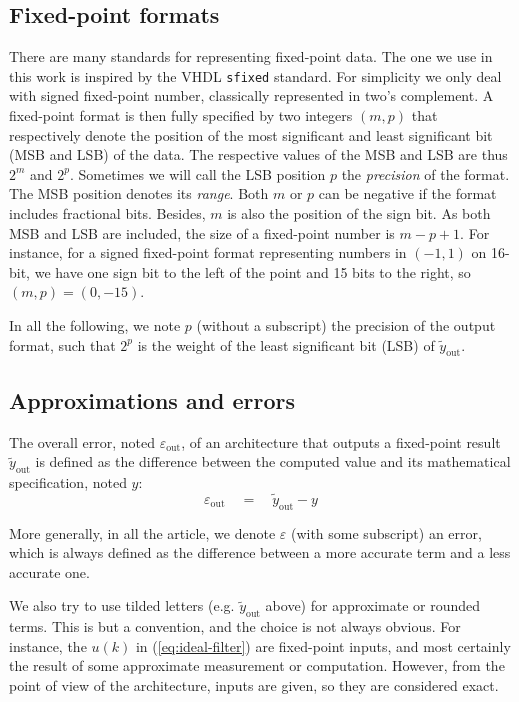 \documentclass[twocolumn]{IEEEtran}
\newcommand{\abserr}{\varepsilon}
\newcommand{\yout}{\widetilde{y}_{\text{out}}}
\newcommand{\epstotal}{\abserr_{\text{out}}}
\begin{document}
\subsection{Fixed-point formats}
There are many standards for representing fixed-point data. 
The one we use in this work is inspired by the VHDL \texttt{sfixed} standard.
For simplicity we only deal with signed fixed-point number, classically represented in two's complement.
A fixed-point format is then fully specified by two integers $(m,p)$ that respectively denote the position of the most significant and least significant bit (MSB and LSB) of the data.
The respective values of the MSB and LSB are thus $2^m$ and $2^p$.
Sometimes we will call the LSB position $p$ the \emph{precision} of the format. 
The MSB position denotes its \emph{range}.
Both $m$ or $p$ can be negative if the format includes fractional bits.
Besides, $m$ is also the position of the sign bit. 
As both MSB and LSB are included, the size of a fixed-point number is $m-p+1$.
For instance, for a signed fixed-point format representing numbers  in $(-1,1)$ on 16-bit, we have one sign bit to the left of the point and 15 bits to the right, so $(m,p)=(0,-15)$.  

In all the following, we note $p$ (without a subscript) the precision of the output format, such that $2^{p}$ is the weight of the least significant bit (LSB) of $\yout$.

\subsection{Approximations and errors}

The overall error, noted $\epstotal$, of an architecture that outputs a fixed-point result $\yout$ is defined as the difference between the computed value  and its mathematical specification, noted $y$:
\begin{equation}
  \label{eq:globalerror1}
  \epstotal\quad  =\quad   \yout-y
\end{equation}

More generally, in all the article, we denote $\abserr$ (with some subscript) an error, which is always defined as the difference between a more accurate term and a less accurate one.

We also try to use tilded letters (e.g. $\yout$ above) for approximate or rounded terms.
This is but a convention, and the choice is not always obvious.
For instance, the $u(k)$  in (\ref{eq:ideal-filter}) are fixed-point inputs, and most certainly the result of some approximate measurement or computation.
However, from the point of view of the architecture, inputs are given, so they are considered exact.
\end{document}
